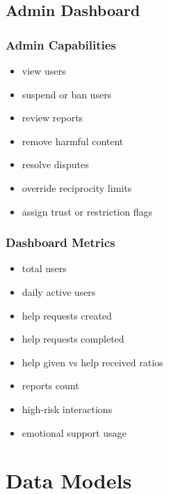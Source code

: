 \documentclass[11pt]{article}
\begin{document}
\subsection{Admin Dashboard}

\subsubsection{Admin Capabilities}
\begin{itemize}[leftmargin=1.5em]
    \item view users
    \item suspend or ban users
    \item review reports
    \item remove harmful content
    \item resolve disputes
    \item override reciprocity limits
    \item assign trust or restriction flags
\end{itemize}

\subsubsection{Dashboard Metrics}
\begin{itemize}[leftmargin=1.5em]
    \item total users
    \item daily active users
    \item help requests created
    \item help requests completed
    \item help given vs help received ratios
    \item reports count
    \item high-risk interactions
    \item emotional support usage
\end{itemize}

\section{Data Models}
\end{document}
